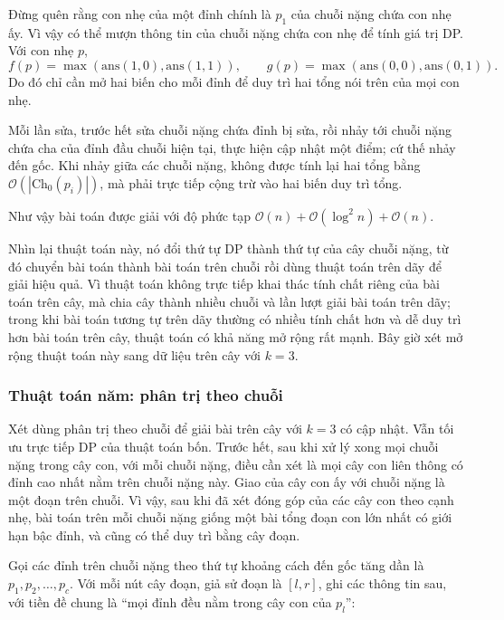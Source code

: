 \documentclass[11pt]{article}
\newcommand{\Oh}{\mathcal{O}}
\begin{document}
Đừng quên rằng con nhẹ của một đỉnh chính là \(p_1\) của chuỗi nặng chứa con
nhẹ ấy. Vì vậy có thể mượn thông tin của chuỗi nặng chứa con nhẹ để tính giá
trị DP. Với con nhẹ \(p\),
\[
  f(p)=\max(\mathrm{ans}(1,0),\mathrm{ans}(1,1)),\qquad
  g(p)=\max(\mathrm{ans}(0,0),\mathrm{ans}(0,1)).
\]
Do đó chỉ cần mở hai biến cho mỗi đỉnh để duy trì hai tổng nói trên của mọi
con nhẹ.

Mỗi lần sửa, trước hết sửa chuỗi nặng chứa đỉnh bị sửa, rồi nhảy tới chuỗi
nặng chứa cha của đỉnh đầu chuỗi hiện tại, thực hiện cập nhật một điểm; cứ thế
nhảy đến gốc. Khi nhảy giữa các chuỗi nặng, không được tính lại hai tổng bằng
\(\Oh(|\mathrm{Ch}_0(p_i)|)\), mà phải trực tiếp cộng trừ vào hai biến duy trì
tổng.

Như vậy bài toán được giải với độ phức tạp
\(\Oh(n)+\Oh(\log^2 n)+\Oh(n)\).

Nhìn lại thuật toán này, nó đổi thứ tự DP thành thứ tự của cây chuỗi nặng, từ
đó chuyển bài toán thành bài toán trên chuỗi rồi dùng thuật toán trên dãy để
giải hiệu quả. Vì thuật toán không trực tiếp khai thác tính chất riêng của bài
toán trên cây, mà chia cây thành nhiều chuỗi và lần lượt giải bài toán trên
dãy; trong khi bài toán tương tự trên dãy thường có nhiều tính chất hơn và dễ
duy trì hơn bài toán trên cây, thuật toán có khả năng mở rộng rất mạnh. Bây
giờ xét mở rộng thuật toán này sang dữ liệu trên cây với \(k=3\).

\subsubsection{Thuật toán năm: phân trị theo chuỗi}

Xét dùng phân trị theo chuỗi để giải bài trên cây với \(k=3\) có cập nhật. Vẫn
tối ưu trực tiếp DP của thuật toán bốn. Trước hết, sau khi xử lý xong mọi
chuỗi nặng trong cây con, với mỗi chuỗi nặng, điều cần xét là mọi cây con liên
thông có đỉnh cao nhất nằm trên chuỗi nặng này. Giao của cây con ấy với chuỗi
nặng là một đoạn trên chuỗi. Vì vậy, sau khi đã xét đóng góp của các cây con
theo cạnh nhẹ, bài toán trên mỗi chuỗi nặng giống một bài tổng đoạn con lớn
nhất có giới hạn bậc đỉnh, và cũng có thể duy trì bằng cây đoạn.

Gọi các đỉnh trên chuỗi nặng theo thứ tự khoảng cách đến gốc tăng dần là
\(p_1,p_2,\ldots,p_c\). Với mỗi nút cây đoạn, giả sử đoạn là \([l,r]\), ghi
các thông tin sau, với tiền đề chung là ``mọi đỉnh đều nằm trong cây con của
\(p_l\)'':
\end{document}
